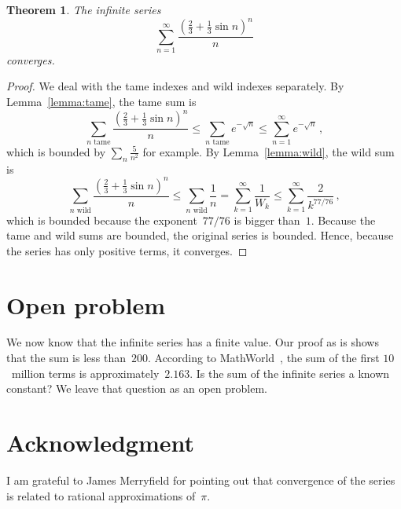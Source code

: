 \documentclass[12pt]{article}
\theoremstyle{plain}
\newtheorem{theorem}{Theorem}
\begin{document}
\begin{theorem}
The infinite series
\[
  \sum_{n=1}^\infty \frac{(\frac{2}{3} + \frac{1}{3} \sin n)^n}{n}
\]
converges.
\end{theorem}

\begin{proof}
We deal with the tame indexes and wild indexes separately. 
By Lemma~\ref{lemma:tame}, the tame sum is 
\[
  \sum_{n \text{ tame}} \frac{(\frac{2}{3} + \frac{1}{3} \sin n)^n}{n}
	  \le \sum_{n \text{ tame}} e^{- \sqrt{n}} 
		\le \sum_{n = 1}^{\infty} e^{- \sqrt{n}} \, ,
\]
which is bounded by $\sum_n \frac{5}{n^2}$ for example.  
By Lemma~\ref{lemma:wild}, the wild sum is 
\[
  \sum_{n \text{ wild}} \frac{(\frac{2}{3} + \frac{1}{3} \sin n)^n}{n}
	  \le \sum_{n \text{ wild}} \frac{1}{n}
		= \sum_{k = 1}^{\infty} \frac{1}{W_k}
		\le \sum_{k = 1}^{\infty} \frac{2}{k^{77/76}} \, ,
\]
which is bounded because the exponent~$77/76$ is bigger than~$1$.  
Because the tame and wild sums are bounded, 
the original series is bounded.  
Hence, because the series has only positive terms, it converges.
\end{proof}

\section{Open problem}

We now know that the infinite series has a finite value.
Our proof as is shows that the sum is less than~$200$.  
According to MathWorld~\cite{MathWorld}, 
the sum of the first $10$~million terms is approximately~$2.163$.
Is the sum of the infinite series a known constant?
We leave that question as an open problem.

\section*{Acknowledgment}

I am grateful to James Merryfield for pointing out that convergence of the series is related to rational approximations of~$\pi$.    
\end{document}
